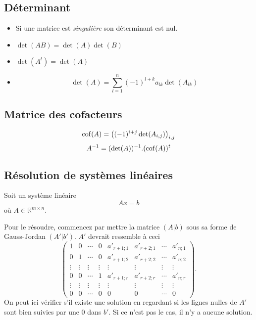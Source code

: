 \subsection{Déterminant}
\begin{itemize}
  \item Si une matrice est \emph{singulière} son déterminant est nul.
  \item $\det(AB) = \det(A) \det(B)$
  \item $\det(A^t) = \det(A)$
  \item \[ \det(A) = \sum_{l = 1}^{n}(-1)^{l+k}a_{lk}\det(A_{lk}) \]
\end{itemize}

\subsection{Matrice des cofacteurs}
\[ \operatorname{cof}(A) = \left((-1)^{i + j}\det(A_{i,j})\right)_{i,j} \]
\[ A^{-1} = (\det(A))^{-1} . (\operatorname{cof}(A))^t \]

\subsection{Résolution de systèmes linéaires}
\label{sec:solvelinsys}
Soit un système linéaire
\[ A x = b \]
où $A \in \mathbb{R}^{m \times n}$.

Pour le résoudre, commencez par mettre la matrice $(A|b)$
sous sa forme de Gauss-Jordan $(A'|b')$.
$A'$ devrait ressemble à ceci
\[ \begin{pmatrix}
    1 & 0 & \cdots & 0 & a'_{r+1;1} & a'_{r+2;1} & \cdots & a'_{n;1}\\
    0 & 1 & \cdots & 0 & a'_{r+1;2} & a'_{r+2;2} & \cdots & a'_{n;2}\\
    \vdots & \vdots & \vdots & \vdots &
    \vdots & \vdots & \vdots & \vdots\\
    0 & 0 & \cdots & 1 & a'_{r+1;r} & a'_{r+2;r} & \cdots & a'_{n;r}\\
    \vdots & \vdots & \vdots & \vdots &
    \vdots & \vdots & \vdots & \vdots\\
    0 & 0 & \cdots & 0 & 0 & 0 & \cdots & 0
\end{pmatrix}. \]
On peut ici vérifier s'il existe une solution en regardant si les lignes
nulles de $A'$ sont bien suivies par une 0 dans $b'$.
Si ce n'est pas le cas, il n'y a aucune solution.

